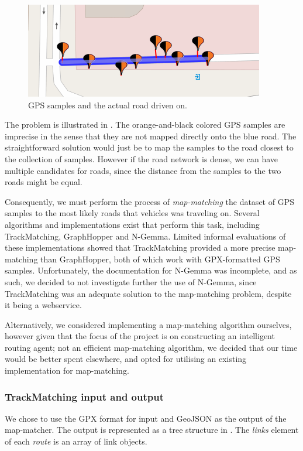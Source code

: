 \begin{figure}
\includegraphics[scale=1]{figures/mapmatching.png}
\caption{GPS samples and the actual road driven on.}
\label{fig:mapmatching}
\end{figure}

The problem is illustrated in . The orange-and-black colored GPS samples are imprecise in the sense that they are not mapped directly onto the blue road. The straightforward solution would just be to map the samples to the road closest to the collection of samples. However if the road network is dense, we can have multiple candidates for roads, since the distance from the samples to the two roads might be equal.

Consequently, we must perform the process of \emph{map-matching} the dataset of GPS samples to the most likely roads that vehicles was traveling on. Several algorithms and implementations exist that perform this task, including TrackMatching\cite{TrackMatching}, GraphHopper\cite{GraphHopper} and N-Gemma\cite{NGemma}. Limited informal evaluations of these implementations showed that TrackMatching provided a more precise map-matching than GraphHopper, both of which work with GPX-formatted GPS samples. Unfortunately, the documentation for N-Gemma was incomplete, and as such, we decided to not investigate further the use of N-Gemma, since TrackMatching was an adequate solution to the map-matching problem, despite it being a webservice.

Alternatively, we considered implementing a map-matching algorithm ourselves, however given that the focus of the project is on constructing an intelligent routing agent; not an efficient map-matching algorithm, we decided that our time would be better spent elsewhere, and opted for utilising an existing implementation for map-matching.

\subsubsection{TrackMatching input and output}
We chose to use the GPX format for input and GeoJSON as the output of the map-matcher. The output is represented as a tree structure in . The \emph{links} element of each \emph{route} is an array of link objects.

